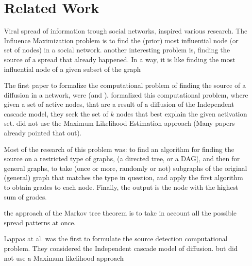 \documentclass[sigconf,anonymous]{aamas}
\begin{document}
\section{Related Work}



Viral spread of information trough social networks, inspired various research. The Influence Maximization problem is to find the (prior) most influential node (or set of nodes) in a social network. another interesting problem is, finding the source of a spread that already happened. In a way, it is like finding the most influential node of a given subset of the graph %


The first paper to formalize the computational problem of finding the source of a diffusion in a network, were \cite{lappas2010finding} (and \cite{shah2010detecting}).  \cite{lappas2010finding} formalized this computational problem, where given a set of active nodes, that are a result of a diffusion of the Independent cascade model, they seek the set of $k$ nodes that best explain the given activation set. \cite{lappas2010finding} did not use the Maximum Likelihood Estimation approach (Many papers already pointed that out).





Most of the research of this problem was: to find an algorithm for finding the source on a restricted type of graphs, (a directed tree, or a DAG), and then for general graphs, to take (once or more, randomly or not) subgraphs of the original (general) graph that matches the type in question, and apply the first algorithm to obtain grades to each node. Finally, the output is the node with the highest sum of grades.

the approach of the Markov tree theorem is to take in account all the possible spread patterns at once.


\cite{lappas2010finding}
Lappas at al. was the first to formulate the source detection computational problem. They considered the Independent cascade model of diffusion. but did not use a Maximum likelihood approach
\end{document}
